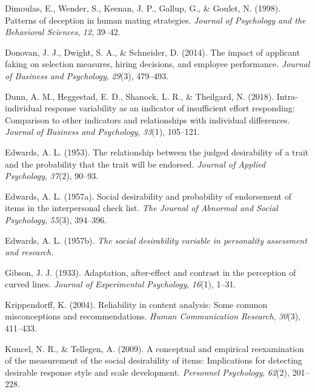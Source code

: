 \documentclass[
  ,jou]{apa6}
\newlength{\cslhangindent}
\newlength{\cslentryspacingunit} %
\newenvironment{CSLReferences}[2] %
 {%
  \setlength{\parindent}{0pt}
  \ifodd #1
  \let\oldpar\par
  \def\par{\hangindent=\cslhangindent\oldpar}
  \fi
  \setlength{\parskip}{#2\cslentryspacingunit}
 }%
 {}
\begin{document}
\begin{CSLReferences}{1}{0}
\leavevmode{}%
Dimoulas, E., Wender, S., Keenan, J. P., Gallup, G., \& Goulet, N. (1998). Patterns of deception in human mating strategies. \emph{Journal of Psychology and the Behavioral Sciences}, \emph{12}, 39--42.

\leavevmode{}%
Donovan, J. J., Dwight, S. A., \& Schneider, D. (2014). The impact of applicant faking on selection measures, hiring decisions, and employee performance. \emph{Journal of Business and Psychology}, \emph{29}(3), 479--493.

\leavevmode{}%
Dunn, A. M., Heggestad, E. D., Shanock, L. R., \& Theilgard, N. (2018). Intra-individual response variability as an indicator of insufficient effort responding: Comparison to other indicators and relationships with individual differences. \emph{Journal of Business and Psychology}, \emph{33}(1), 105--121.

\leavevmode{}%
Edwards, A. L. (1953). The relationship between the judged desirability of a trait and the probability that the trait will be endorsed. \emph{Journal of Applied Psychology}, \emph{37}(2), 90--93.

\leavevmode{}%
Edwards, A. L. (1957a). Social desirability and probability of endorsement of items in the interpersonal check list. \emph{The Journal of Abnormal and Social Psychology}, \emph{55}(3), 394--396.

\leavevmode{}%
Edwards, A. L. (1957b). \emph{The social desirability variable in personality assessment and research.}

\leavevmode{}%
Gibson, J. J. (1933). Adaptation, after-effect and contrast in the perception of curved lines. \emph{Journal of Experimental Psychology}, \emph{16}(1), 1--31.

\leavevmode{}%
Krippendorff, K. (2004). Reliability in content analysis: Some common misconceptions and recommendations. \emph{Human Communication Research}, \emph{30}(3), 411--433.

\leavevmode{}%
Kuncel, N. R., \& Tellegen, A. (2009). A conceptual and empirical reexamination of the measurement of the social desirability of items: Implications for detecting desirable response style and scale development. \emph{Personnel Psychology}, \emph{62}(2), 201--228.


\end{CSLReferences}
\end{document}
